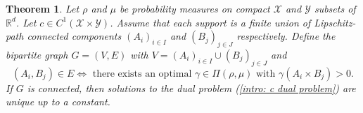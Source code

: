 \documentclass[11pt, oneside, titlepage]{book}
\theoremstyle{plain}
\newtheorem{theorem}{Theorem}[chapter]
\theoremstyle{definition}
\newcommand{\R}{\mathbb{R}}
\newcommand{\X}{\mathcal{X}}
\newcommand{\Y}{\mathcal{Y}}
\begin{document}
\begin{theorem}
\label{thrm: uniqueness graph continuous case}
    Let $\rho$ and $\mu$ be probability measures on compact $\X$ and $\Y$ subsets of $\R^d$. Let $c \in C^1(\X \times \Y)$. Assume that each support is a finite union of Lipschitz-path connected components $(A_i)_{i \in I}$ and $(B_j)_{j \in J}$ respectively. Define the bipartite graph $G = (V, E)$ with $V = (A_i)_{i \in I} \cup (B_j)_{j \in J}$ and 
    \begin{equation*}
        (A_i, B_j) \in E \iff \text{ there exists an optimal } \gamma \in \Pi(\rho, \mu) \text{ with } \gamma(A_i \times B_j) > 0.
    \end{equation*}
    If $G$ is connected, then solutions to the dual problem (\ref{intro: c dual problem}) are unique up to a constant. 
\end{theorem}
\end{document}

